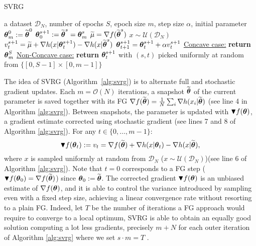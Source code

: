 \begin{algorithm}[h]
	\caption{SVRG}
	\label{alg:svrg}
	\begin{algorithmic}[1]
		 a dataset $\mathcal{D}_N$, number of epochs $S$, epoch size $m$, step size $\alpha$, initial parameter $\boldsymbol{\theta}_{m}^0:=\widetilde{\boldsymbol{\theta}}^0$
		\STATE $\boldsymbol{\theta}_0^{s+1} := \widetilde{\boldsymbol{\theta}}^{s} = \boldsymbol{\theta}_{m}^s$
		\STATE $\widetilde{\mu} = \nabla f(\widetilde{\boldsymbol{\theta}}^s)$
		\STATE $x \sim \mathcal{U}\left(\mathcal{D}_N\right)$
		\STATE $v^{s+1}_t = 
		\widetilde{\mu} + 
		\nabla h(x|\boldsymbol{\theta}_t^{s+1}) -
		\nabla h(x|\widetilde{\boldsymbol{\theta}}^{s})
		$
		\STATE $\boldsymbol{\theta}_{t+1}^{s+1} = \boldsymbol{\theta}_t^{s+1} + \alpha v^{s+1}_t$
		\ENDFOR
		\ENDFOR
		\STATE \underline{Concave case:} \textbf{return} $\boldsymbol{\theta}_{m}^S$
		\STATE \underline{Non-Concave case:} \textbf{return} $\boldsymbol{\theta}_t^{s+1}$ with $(s,t)$ picked uniformly at random from $\{[0,S-1]\times[0,m-1]\}$
	\end{algorithmic}
\end{algorithm} 

The idea of \acs{SVRG} (Algorithm~\ref{alg:svrg}) is to alternate full and stochastic gradient updates. 
Each $m = \mathcal{O}(N)$ iterations, a snapshot $\widetilde{\boldsymbol{\theta}}$ of the current parameter is saved together with its \acs{FG} $\nabla f(\widetilde{\boldsymbol{\theta}}) = \frac{1}{N} \sum_i \nabla h(x_i|\widetilde{\boldsymbol{\theta}})$ (see line 4 in Algorithm \ref{alg:svrg}).
Between snapshots, the parameter is updated with $\blacktriangledown f(\boldsymbol{\theta})$, a gradient estimate corrected using stochastic gradient (see lines 7 and 8 of Algorithm \ref{alg:svrg}). For any $t \in \{0,\ldots,m-1\}$:
\begin{equation}\label{E:svrg.gradient.correction}
        \blacktriangledown f(\boldsymbol{\theta}_{t}) := v_t = \nabla f(\widetilde{\boldsymbol{\theta}}) + \nabla h(x | \boldsymbol{\theta}_t) - \nabla h(x | \widetilde{\boldsymbol{\theta}}),
\end{equation} 
where $x$ is sampled uniformly at random from $\mathcal{D}_N$ (\ie $x \sim \mathcal{U}(\mathcal{D}_N)$)(see line 6 of Algorithm \ref{alg:svrg}).
Note that $t=0$ corresponds to a \acs{FG} step (\ie $\blacktriangledown f(\boldsymbol{\theta}_0) = \nabla f(\widetilde{\boldsymbol{\theta}})$) since $\boldsymbol{\theta}_0 := \widetilde{\boldsymbol{\theta}}$.
The corrected gradient $\blacktriangledown f(\boldsymbol{\theta})$ is an unbiased estimate of $\nabla f(\boldsymbol{\theta})$, and it is able to control the variance introduced by sampling even with a fixed step size, achieving a linear convergence rate without resorting to a plain \acs{FG}. Indeed, let $T$ be the number of iterations a \acs{FG} approach would require to converge to a local optimum, \acs{SVRG} is able to obtain an equally good solution computing a lot less gradients, precisely $m+N$ for each outer iteration of Algorithm \ref{alg:svrg} where we set $s\cdot m=T$ \citep{johnson2013accelerating}.

